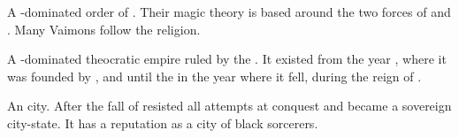 \documentclass
  [a4paper,
   12pt,
   oneside
  ]%
  {article}
\begin{document}
\begin{gloss}
\begin{comment}
\paragraph{Vaimon}
\end{comment}
A -dominated order of .
Their magic theory is based around the two forces of  and . 
Many Vaimons follow the  religion.



\begin{comment}
\paragraph{\VaimonCaliphate}
\end{comment}
\gitem{\VaimonCaliphate}
\index{\VaimonCaliphate}
A \human-dominated theocratic empire ruled by the . 
It existed from the year , where it was founded by , and until the  in the year 	 where it fell, during the reign of . 



\begin{comment}
\paragraph{Yormis}
\end{comment}
\gitem{\Yormis}
\index{\Yormis}
An \Ortaican city. 
After the fall of \Ortaica \Yormis resisted all attempts at conquest and became a sovereign city-state. 
It has a reputation as a city of black sorcerers. 




















\end{gloss}
\end{document}
